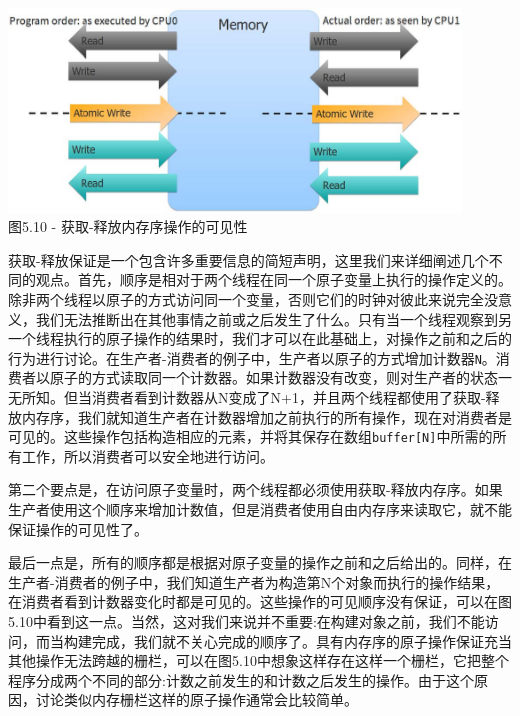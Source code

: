 \begin{center}
\includegraphics[width=0.9\textwidth]{content/1/chapter5/images/10.jpg}\\
图5.10 - 获取-释放内存序操作的可见性
\end{center}

获取-释放保证是一个包含许多重要信息的简短声明，这里我们来详细阐述几个不同的观点。首先，顺序是相对于两个线程在同一个原子变量上执行的操作定义的。除非两个线程以原子的方式访问同一个变量，否则它们的时钟对彼此来说完全没意义，我们无法推断出在其他事情之前或之后发生了什么。只有当一个线程观察到另一个线程执行的原子操作的结果时，我们才可以在此基础上，对操作之前和之后的行为进行讨论。在生产者-消费者的例子中，生产者以原子的方式增加计数器\texttt{N}。消费者以原子的方式读取同一个计数器。如果计数器没有改变，则对生产者的状态一无所知。但当消费者看到计数器从N变成了N+1，并且两个线程都使用了获取-释放内存序，我们就知道生产者在计数器增加之前执行的所有操作，现在对消费者是可见的。这些操作包括构造相应的元素，并将其保存在数组\texttt{buffer[N]}中所需的所有工作，所以消费者可以安全地进行访问。

第二个要点是，在访问原子变量时，两个线程都必须使用获取-释放内存序。如果生产者使用这个顺序来增加计数值，但是消费者使用自由内存序来读取它，就不能保证操作的可见性了。

最后一点是，所有的顺序都是根据对原子变量的操作之前和之后给出的。同样，在生产者-消费者的例子中，我们知道生产者为构造第N个对象而执行的操作结果，在消费者看到计数器变化时都是可见的。这些操作的可见顺序没有保证，可以在图5.10中看到这一点。当然，这对我们来说并不重要:在构建对象之前，我们不能访问，而当构建完成，我们就不关心完成的顺序了。具有内存序的原子操作保证充当其他操作无法跨越的栅栏，可以在图5.10中想象这样存在这样一个栅栏，它把整个程序分成两个不同的部分:计数之前发生的和计数之后发生的操作。由于这个原因，讨论类似内存栅栏这样的原子操作通常会比较简单。


